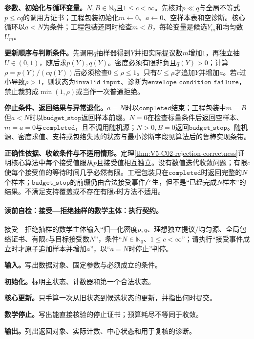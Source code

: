 \textbf{参数、初始化与循环变量。}$N,B\in\mathbb N_0$且$1\le c<\infty$。先核对$p\ll q$与全局不等式$p\le cq$的调用方证书；工程包装初始化$m\leftarrow0$、$a\leftarrow0$、空样本表和空诊断。核心循环以$a<N$为条件；工程包装还同时检查$m<B$，每轮变量是候选$Y_m$和均匀数$U_m$。

\textbf{更新顺序与判断条件。}先调用$q$抽样器得到$Y$并把实际提议数$m$增加$1$，再独立抽$U\in(0,1)$，随后求$p(Y),q(Y)$。密度必须有限非负且$q(Y)>0$；计算$\rho=p(Y)/(cq(Y))$后必须检查$0\le\rho\le1$。只有$U\le\rho$才追加$Y$并增加$a$。若$c$过小导致$\rho>1$，则状态为$\mathtt{invalid\_input}$、诊断为$\mathtt{envelope\_condition\_failure}$，禁止裁剪成$\min(1,\rho)$或当作一次普通拒绝。

\textbf{停止条件、返回结果与异常退化。}$a=N$时以$\mathtt{completed}$结束；工程包装中$m=B$但$a<N$时以$\mathtt{budget\_stop}$返回样本前缀。$N=0$在检查标量条件后返回空样本、$m=a=0$与$\mathtt{completed}$，且不调用随机源；$N>0,B=0$返回$\mathtt{budget\_stop}$。随机源、密度求值、支持或包络失败的状态与最小诊断字段见算法后的鲁棒实现条带。

\textbf{正确性依据、收敛条件与不适用情形。}定理\ref{thm:V5-C02-rejection-correctness}证明核心算法中每个接受值服从$p$且接受值相互独立。没有数值迭代收敛问题；有限$c$使每个接受值的等待时间几乎必然有限。工程包装只在$\mathtt{completed}$时返回完整的$N$个样本；$\mathtt{budget\_stop}$的前缀仍由合法接受事件产生，但不是“已经完成$N$样本”的结果。不满足支持覆盖或不存在有限$c$时方法不适用。

\begingroup
{}
\renewcommand{\thealgocf}{\thechapter.\arabic{algocf}A}
\paragraph{读前自检：接受—拒绝抽样的数学主体：执行契约。}接受—拒绝抽样的数学主体输入“归一化密度$p,q$、理想独立提议/均匀源、全局包络证书、有限$c$与目标接受数$N$”，条件“$N\in\mathbb N_0$、$1\le c<\infty$”；请执行“接受事件成立时才原子追加样本并增加$a$”，以“$a=N$时停止”判停。\par
\begin{keypointbox}[title={接受—拒绝抽样的数学主体：五步阅读}]
\textbf{输入。}写出数据对象、固定参数与必须成立的条件。\par
\textbf{初始化。}标明主状态、计数器和第一个合法状态。\par
\textbf{核心更新。}只手算一次从旧状态到候选状态的更新，并指出何时提交。\par
\textbf{数学停止。}写出能直接核验的停止证书；预算耗尽不等同于收敛。\par
\textbf{输出。}列出返回对象、实际计数、中心状态和用于复核的诊断。
\end{keypointbox}

